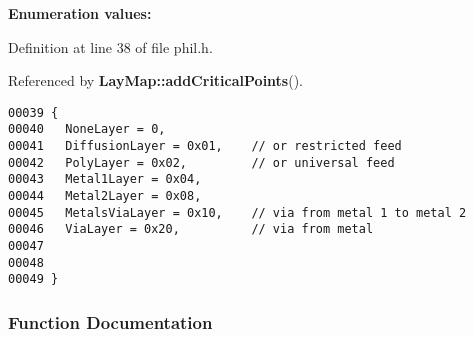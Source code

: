 \begin{Desc}
\item[{\bf Enumeration values:}]\par
\begin{description}
\item[
\label{phil.h_a16}
{\em None\-Layer}]\item[
\label{phil.h_a17}
{\em Diffusion\-Layer}]\item[
\label{phil.h_a18}
{\em Poly\-Layer}]\item[
\label{phil.h_a19}
{\em Metal1Layer}]\item[
\label{phil.h_a20}
{\em Metal2Layer}]\item[
\label{phil.h_a21}
{\em Metals\-Via\-Layer}]\item[
\label{phil.h_a22}
{\em Via\-Layer}]\end{description}
\end{Desc}



Definition at line 38 of file phil.h.

Referenced by {\bf Lay\-Map::add\-Critical\-Points}().\small\begin{verbatim}00039 {
00040   NoneLayer = 0,
00041   DiffusionLayer = 0x01,    // or restricted feed
00042   PolyLayer = 0x02,         // or universal feed
00043   Metal1Layer = 0x04,
00044   Metal2Layer = 0x08,
00045   MetalsViaLayer = 0x10,    // via from metal 1 to metal 2
00046   ViaLayer = 0x20,          // via from metal 
00047 
00048 
00049 }
\end{verbatim}\normalsize 


\subsubsection{Function Documentation}
\label{phil.h_a15}
